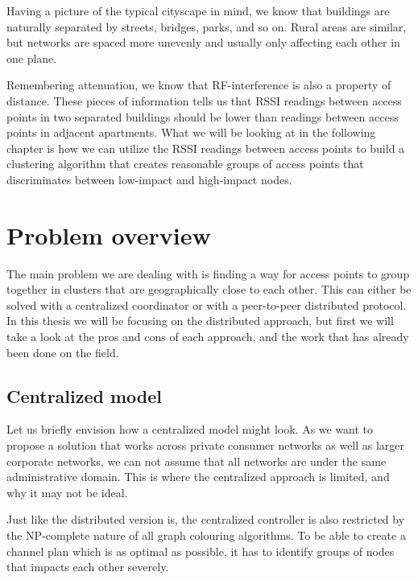 Having a picture of the typical cityscape in mind, we know that buildings are naturally
separated by streets, bridges, parks, and so on. Rural areas are similar, but networks are spaced more unevenly
and usually only affecting each other in one plane.

Remembering attenuation, we know that RF-interference is also a property of distance. 
These pieces of information tells us that RSSI readings between access points in two separated buildings should be lower than readings between access points in adjacent apartments.
What we will be looking at in the following chapter is how we can utilize the RSSI readings between access points to build a clustering algorithm that creates reasonable groups
of access points that discriminates between low-impact and high-impact nodes.  


\section{Problem overview}
The main problem we are dealing with is finding a way for access points to group together in clusters that are geographically close to each other. This can either be solved with a centralized
coordinator or with a peer-to-peer distributed protocol. In this thesis we will be focusing on the distributed approach, but first we will take a look at the pros and cons of each approach, and
the work that has already been done on the field.
\subsection{Centralized model}
Let us briefly envision how a centralized model might look. As we want to propose a solution that works across private consumer networks as well as larger corporate networks,
we can not assume that all networks are under the same administrative domain. This is where the centralized approach is limited, and why it may not be ideal.

Just like the distributed version is, the centralized controller is also restricted by the NP-complete nature of all graph colouring algorithms.
To be able to create a channel plan which is as optimal as possible, it has to identify groups of nodes that impacts each other severely. 

